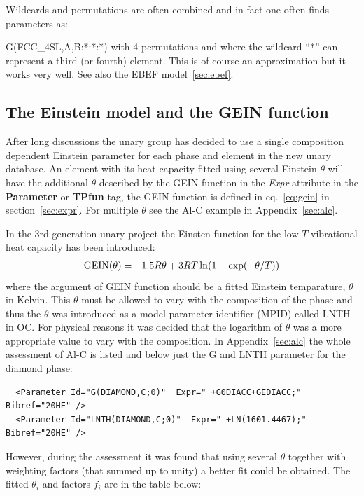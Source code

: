 \documentclass{article}
\begin{document}
Wildcards and permutations are often combined and in fact one
often finds parameters as:

G(FCC\_4SL,A,B:*:*:*) with 4 permutations and where the wildcard ``*''
can represent a third (or fourth) element.  This is of course an
approximation but it works very well.  See also the EBEF
model~\ref{sec:ebef}.

\subsection{The Einstein model and the GEIN function}\label{sec:gein}

After long discussions the unary group has decided to use a single
composition dependent Einstein parameter for each phase and element in
the new unary database.  An element with its heat capacity fitted
using several Einstein $\theta$ will have the additional $\theta$
described by the GEIN function in the {\em Expr} attribute in the {\bf
  Parameter} or {\bf TPfun} tag, the GEIN function is defined in
eq.~\ref{eq:gein} in section~\ref{sec:expr}.  For multiple $\theta$
see the Al-C example in Appendix~\ref{sec:alc}.

In the 3rd generation unary project the Einsten function for the low
$T$ vibrational heat capacity has been introduced:
\begin{eqnarray}
{\rm GEIN}(\theta) &=& 1.5R\theta+3RT\ln(1-\exp(-\theta/T)) \label{eq:gein}
\end{eqnarray}
where the argument of GEIN function should be a fitted Einstein
temparature, $\theta$ in Kelvin.  This $\theta$ must be allowed to
vary with the composition of the phase and thus the $\theta$ was
introduced as a model parameter identifier (MPID) called LNTH in OC.
For physical reasons it was decided that the logarithm of $\theta$ was
a more appropriate value to vary with the composition.  In
Appendix~\ref{sec:alc} the whole assessment of Al-C is listed and
below just the G and LNTH parameter for the diamond phase:

\begin{verbatim}
  <Parameter Id="G(DIAMOND,C;0)"  Expr=" +G0DIACC+GEDIACC;"  Bibref="20HE" />
  <Parameter Id="LNTH(DIAMOND,C;0)"  Expr=" +LN(1601.4467);"  Bibref="20HE" />
\end{verbatim}

However, during the assessment it was found that using several
$\theta$ together with weighting factors (that summed up to unity) a
better fit could be obtained.  The fitted $\theta_i$ and factors $f_i$
are in the table below:
\end{document}
